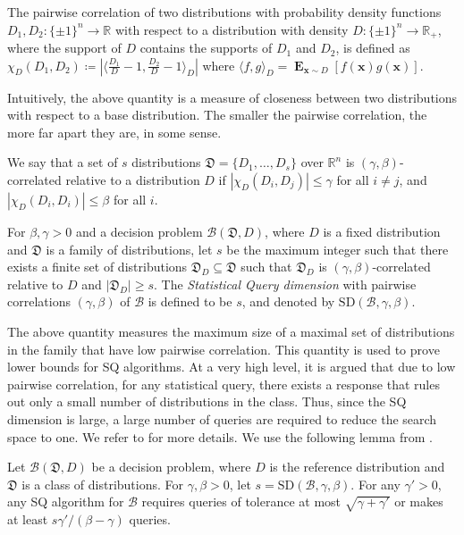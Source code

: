 \documentclass{theoretics}
\newcommand{\eqdef}{\coloneqq}
\renewcommand\vec[1]{\mathbf{#1}}
\DeclareMathOperator*{\E}{\mathbf{E}}
\newcommand{\R}{\mathbb{R}}
\newcommand{\D}{D}
\newcommand{\1}{\Ind}
\newcommand{\x}{\vec x}
\begin{document}
\begin{definition} \label{def:pc}
    The pairwise correlation of two distributions with probability density functions
    $\D_1, \D_2 : \{\pm 1\}^{n} \to \R$ with respect to a distribution with
    density $\D: \{\pm 1\}^n \to \R_+$, where the support of $\D$ contains
    the supports of $\D_1$ and $\D_2$, is defined as
    $\chi_{\D}(\D_1, \D_2) \eqdef |\langle \frac{D_1}{D}-1,\frac{D_2}{D}-1\rangle_D|$ where $\langle f,g\rangle_D=\E_{\x\sim D}[f(\x)g(\x)]$.
\end{definition}
Intuitively, the above quantity is a measure of closeness between two distributions with respect to a base distribution. The smaller the pairwise correlation, the more far apart they are, in some sense.
\begin{definition} \label{def:uncor}
    We say that a set of $s$ distributions $\mathfrak{D} = \{\D_1, \ldots , \D_s \}$
    over $\R^n$ is $(\gamma, \beta)$-correlated relative to a distribution $\D$
    if $|\chi_\D(\D_i, \D_j)| \leq \gamma$ for all $i \neq j$,
    and $|\chi_\D(\D_i, \D_i)| \leq \beta$ for all $i$.
\end{definition}

\begin{definition} \label{def:sq-dim}
    For $\beta, \gamma > 0$ and a decision problem $\mathcal{B}(\mathfrak D, \D)$,
    where $\D$ is a fixed distribution and $\mathfrak D$ is a family of distributions,
    let $s$ be the maximum integer such that there exists a finite set of distributions
    $\mathfrak{D}_\D \subseteq \mathfrak D$ such that
    $\mathfrak{D}_\D$ is $(\gamma, \beta)$-correlated relative to $\D$
    and $|\mathfrak{D}_\D| \geq s.$ The {\em Statistical Query dimension}
    with pairwise correlations $(\gamma, \beta)$ of $\mathcal{B}$ is defined to be $s$,
    and denoted by $\mathrm{SD}(\mathcal{B},\gamma,\beta)$.
\end{definition}
The above quantity measures the maximum size of a maximal set of distributions in the family that have low pairwise correlation. This quantity is used to prove lower bounds for SQ algorithms. At a very high level, it is argued that due to low pairwise correlation, for any statistical query, there exists a response that rules out only a small number of distributions in the class. Thus, since the SQ dimension is large, a large number of queries are required to reduce the search space to one. We refer to \cite{FeldmanGRVX17,reyzin2020statistical} for more details. We use the following lemma from \cite{FeldmanGRVX17}.
\begin{lemma} \label{lem:sq-from-pairwise}
    Let $\mathcal{B}(\mathfrak D, \D)$ be a decision problem, where $\D$ is the reference distribution
    and $\mathfrak{D}$ is a class of distributions. For $\gamma, \beta >0$,
    let $s= \mathrm{SD}(\mathcal{B}, \gamma, \beta)$.
    For any $\gamma' > 0$, any SQ algorithm for $\mathcal{B}$ requires queries of tolerance at most $\sqrt{\gamma + \gamma'}$ or makes at least
    $s  \gamma' /(\beta - \gamma)$ queries.
\end{lemma}
\end{document}
